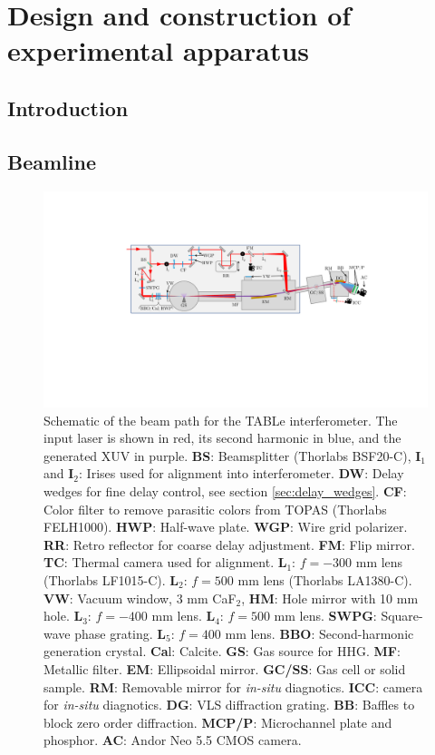 \chapter{Design and construction of experimental apparatus}
\label{beamline}

\section{Introduction}
\label{intro_beamline}


\section{Beamline}
\label{sec:full_beamline}


\begin{figure}
	\centering
	\includegraphics[width=1.0\textwidth]{figures/Beamline/beampath_sketch_3.pdf}
	\caption[Schematic of TABLe optical layout.]{Schematic of the beam path for the TABLe interferometer. The input laser is shown in red, its second harmonic in  blue, and the generated XUV in purple.  \textbf{BS}: Beamsplitter (Thorlabs BSF20-C), \textbf{I$_1$} and \textbf{I$_2$}: Irises used for alignment into interferometer. \textbf{DW}: Delay wedges for fine delay control, see section \ref{sec:delay_wedges}. \textbf{CF}: Color filter to remove parasitic colors from TOPAS (Thorlabs FELH1000). \textbf{HWP}: Half-wave plate. \textbf{WGP}: Wire grid polarizer. \textbf{RR}: Retro reflector for coarse delay adjustment.  \textbf{FM}: Flip mirror. \textbf{TC}: Thermal camera used for alignment.  \textbf{L$_1$}: $f=-300$ mm lens (Thorlabs LF1015-C). \textbf{L$_2$}: $f=500$ mm lens (Thorlabs LA1380-C). \textbf{VW}: Vacuum window, 3 mm CaF$_2$, \textbf{HM}: Hole mirror with 10 mm hole.  \textbf{L$_3$}: $f=-400$ mm lens.  \textbf{L$_4$}: $f=500$ mm lens. \textbf{SWPG}: Square-wave phase grating. \textbf{L$_5$}: $f=400$ mm lens.  \textbf{BBO}: Second-harmonic generation crystal.  \textbf{Ca}l: Calcite. \textbf{GS}: Gas source for HHG. \textbf{MF}: Metallic filter. \textbf{EM}: Ellipsoidal mirror. \textbf{GC/SS}: Gas cell or solid sample. \textbf{RM}: Removable mirror for \textit{in-situ} diagnotics.    \textbf{ICC}: camera for \textit{in-situ} diagnotics. \textbf{DG}: VLS diffraction grating. \textbf{BB}: Baffles to block zero order diffraction.  \textbf{MCP/P}: Microchannel plate and phosphor.  \textbf{AC}: Andor Neo 5.5 CMOS camera.}
	\label{fig:beampath_sketch}
\end{figure}


